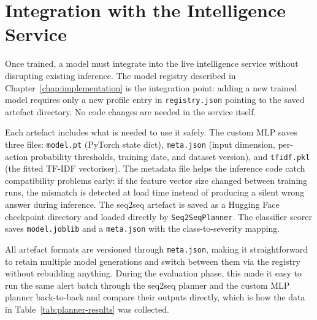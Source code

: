 \section{Integration with the Intelligence Service}
\label{sec:training-integration}

Once trained, a model must integrate into the live intelligence service without disrupting existing inference. The model registry described in Chapter~\ref{chap:implementation} is the integration point: adding a new trained model requires only a new profile entry in \texttt{registry.json} pointing to the saved artefact directory. No code changes are needed in the service itself.

Each artefact includes what is needed to use it safely. The custom MLP saves three files: \texttt{model.pt} (PyTorch state dict), \texttt{meta.json} (input dimension, per-action probability thresholds, training date, and dataset version), and \texttt{tfidf.pkl} (the fitted TF-IDF vectoriser). The metadata file helps the inference code catch compatibility problems early: if the feature vector size changed between training runs, the mismatch is detected at load time instead of producing a silent wrong answer during inference. The seq2seq artefact is saved as a Hugging Face checkpoint directory and loaded directly by \texttt{Seq2SeqPlanner}. The classifier scorer saves \texttt{model.joblib} and a \texttt{meta.json} with the class-to-severity mapping.

All artefact formats are versioned through \texttt{meta.json}, making it straightforward to retain multiple model generations and switch between them via the registry without rebuilding anything. During the evaluation phase, this made it easy to run the same alert batch through the seq2seq planner and the custom MLP planner back-to-back and compare their outputs directly, which is how the data in Table~\ref{tab:planner-results} was collected.
